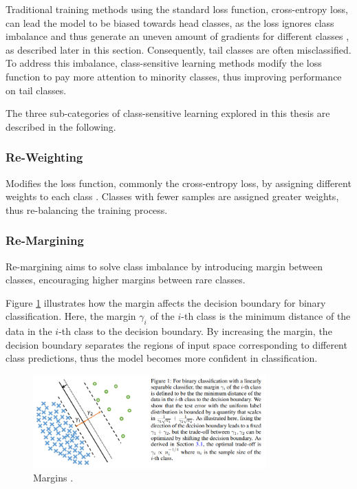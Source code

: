 Traditional training methods using the standard loss function, cross-entropy loss, can lead the model to be biased towards head classes, as the loss ignores class imbalance and thus generate an uneven amount of gradients for different classes \cite{zhang2023deep}, as described later in this section. Consequently, tail classes are often misclassified. To address this imbalance, class-sensitive learning methods modify the loss function to pay more attention to minority classes, thus improving performance on tail classes.

The three sub-categories of class-sensitive learning explored in this thesis are described in the following.

\subsubsection{Re-Weighting}
\label{sec:re-weighting}
Modifies the loss function, commonly the cross-entropy loss, by assigning different weights to each class \cite{zhang2023deep}. Classes with fewer samples are assigned greater weights, thus re-balancing the training process.

\subsubsection{Re-Margining}
\label{sec:re-margining}
Re-margining aims to solve class imbalance by introducing margin between classes, encouraging higher margins between rare classes. 

Figure \ref{fig:decision_boundaries} illustrates how the margin affects the decision boundary for binary classification. Here, the margin $\gamma_i$ of the $i$-th class is the minimum distance of the data in the $i$-th class to the decision boundary.  By increasing the margin, the decision boundary separates the regions of input space corresponding to different class predictions, thus the model becomes more confident in classification.


\begin{figure}[ht]
    \centering
    \includegraphics[width=0.8\textwidth]{Images/decision_boundary.png} 
    \caption{Margins \cite{cao2019learningimbalanceddatasetslabeldistributionaware}. }
    \label{fig:decision_boundaries} 
\end{figure}


